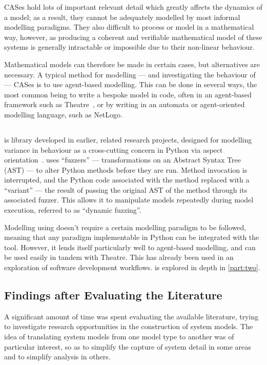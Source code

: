 \documentclass{article}
\begin{document}
CASes hold lots of important relevant detail which greatly affects the dynamics
of a model; as a result, they cannot be adequately modelled by most informal
modelling paradigms. They also difficult to process or model in a mathematical
way, however, as producing a coherent and verifiable mathematical model of these
systems is generally intractable or impossible due to their non-linear
behaviour\cite{holland_studying_adaptive_systems}.\par

Mathematical models can therefore be made in certain cases, but alternatives are
necessary. A typical method for modelling --- and investigating the behaviour of
--- CASes is to use agent-based modelling\cite{hewitt}. This can be done in
several ways, the most common being to write a bespoke model in code, often in
an agent-based framework such as Theatre~\cite{theatre_repo}, or by writing in
an automata or agent-oriented modelling language, such as
NetLogo\cite{netlogo}.\par


\subsection{\pdsf{}}
\pdsf{} is library developed in earlier, related research projects, designed for
modelling variance in behaviour as a cross-cutting concern in Python via
aspect orientation~\cite{aspect_orientation}. \pdsf{} uses ``fuzzers'' ---
transformations on an Abstract Syntax Tree (AST) --- to alter Python methods
before they are run. Method invocation is interrupted, and the Python code
associated with the method replaced with a ``variant'' --- the result of passing
the original AST of the method through its associated fuzzer. This allows it to
manipulate models repeatedly during model execution, referred to as ``dynamic
fuzzing''.\par

Modelling using \pdsf{} doesn't require a certain modelling paradigm to be
followed, meaning that any paradigm implementable in Python can be integrated
with the tool. However, it lends itself particularly well to agent-based
modelling, and can be used easily in tandem with Theatre. This has already been
used in an exploration of software development workflows\cite{caise_forum_18}.
\pdsf{} is explored in depth in \cref{part:two}.\par

\subsection{Findings after Evaluating the Literature}
A significant amount of time was spent evaluating the available literature,
trying to investigate research opportunities in the construction of system
models. The idea of translating system models from one model type to another was
of particular interest, so as to simplify the capture of system detail in some
areas and to simplify analysis in others.\par
\end{document}
